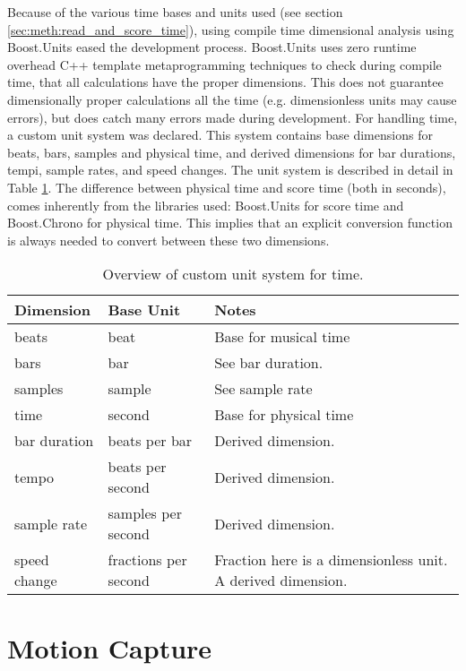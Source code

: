 Because of the various time bases and units used
(see section \ref{sec:meth:read_and_score_time}),
using compile time dimensional analysis using Boost.Units \cite{needed?}
eased the development process.
Boost.Units uses zero runtime overhead C++ template metaprogramming \cite{abrahams?}
techniques to check during compile time,
that all calculations have the proper dimensions.
This does not guarantee dimensionally proper calculations all the time
(e.g. dimensionless units may cause errors),
but does catch many errors made during development.
For handling time,
a custom unit system was declared.
This system contains base dimensions for
beats, bars, samples and physical time,
and derived dimensions for
bar durations, tempi, sample rates, and speed changes.
The unit system is described in detail in Table \ref{tab:score_units}.
The difference between physical time and score time (both in seconds),
comes inherently from the libraries used:
Boost.Units for score time and Boost.Chrono for physical time.
This implies that an explicit conversion function is always
needed to convert between these two dimensions.

\begin{table}
\begin{center}
\begin{tabular}{ | l  l  p{5.5cm} |}
\hline
Dimension & Base Unit & Notes \\ \hline
beats & beat & Base for musical time \\
bars & bar & See bar duration. \\
samples & sample & See sample rate\\
time & second & Base for physical time \\
bar duration & beats per bar & Derived dimension. \\
tempo & beats per second & Derived dimension. \\
sample rate & samples per second & Derived dimension. \\
speed change & fractions per second & Fraction here is a dimensionless unit. A derived dimension. \\
\hline
\end{tabular}
\caption{Overview of custom unit system for time.}
\label{tab:score_units}
\end{center}
\end{table}

\section{Motion Capture}

